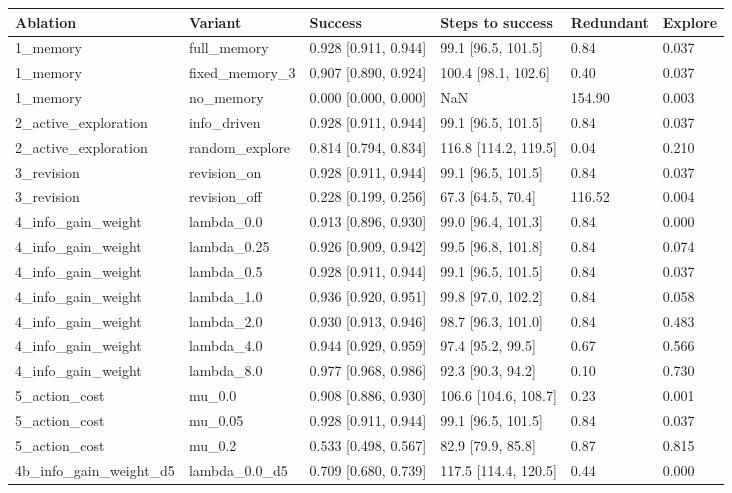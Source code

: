 \begin{tabular}{llllll}
\toprule
Ablation & Variant & Success & Steps to success & Redundant & Explore \\
\midrule
1\_memory & full\_memory & 0.928 [0.911, 0.944] & 99.1 [96.5, 101.5] & 0.84 & 0.037 \\
1\_memory & fixed\_memory\_3 & 0.907 [0.890, 0.924] & 100.4 [98.1, 102.6] & 0.40 & 0.037 \\
1\_memory & no\_memory & 0.000 [0.000, 0.000] & NaN & 154.90 & 0.003 \\
2\_active\_exploration & info\_driven & 0.928 [0.911, 0.944] & 99.1 [96.5, 101.5] & 0.84 & 0.037 \\
2\_active\_exploration & random\_explore & 0.814 [0.794, 0.834] & 116.8 [114.2, 119.5] & 0.04 & 0.210 \\
3\_revision & revision\_on & 0.928 [0.911, 0.944] & 99.1 [96.5, 101.5] & 0.84 & 0.037 \\
3\_revision & revision\_off & 0.228 [0.199, 0.256] & 67.3 [64.5, 70.4] & 116.52 & 0.004 \\
4\_info\_gain\_weight & lambda\_0.0 & 0.913 [0.896, 0.930] & 99.0 [96.4, 101.3] & 0.84 & 0.000 \\
4\_info\_gain\_weight & lambda\_0.25 & 0.926 [0.909, 0.942] & 99.5 [96.8, 101.8] & 0.84 & 0.074 \\
4\_info\_gain\_weight & lambda\_0.5 & 0.928 [0.911, 0.944] & 99.1 [96.5, 101.5] & 0.84 & 0.037 \\
4\_info\_gain\_weight & lambda\_1.0 & 0.936 [0.920, 0.951] & 99.8 [97.0, 102.2] & 0.84 & 0.058 \\
4\_info\_gain\_weight & lambda\_2.0 & 0.930 [0.913, 0.946] & 98.7 [96.3, 101.0] & 0.84 & 0.483 \\
4\_info\_gain\_weight & lambda\_4.0 & 0.944 [0.929, 0.959] & 97.4 [95.2, 99.5] & 0.67 & 0.566 \\
4\_info\_gain\_weight & lambda\_8.0 & 0.977 [0.968, 0.986] & 92.3 [90.3, 94.2] & 0.10 & 0.730 \\
5\_action\_cost & mu\_0.0 & 0.908 [0.886, 0.930] & 106.6 [104.6, 108.7] & 0.23 & 0.001 \\
5\_action\_cost & mu\_0.05 & 0.928 [0.911, 0.944] & 99.1 [96.5, 101.5] & 0.84 & 0.037 \\
5\_action\_cost & mu\_0.2 & 0.533 [0.498, 0.567] & 82.9 [79.9, 85.8] & 0.87 & 0.815 \\
4b\_info\_gain\_weight\_d5 & lambda\_0.0\_d5 & 0.709 [0.680, 0.739] & 117.5 [114.4, 120.5] & 0.44 & 0.000 \\

\end{tabular}
